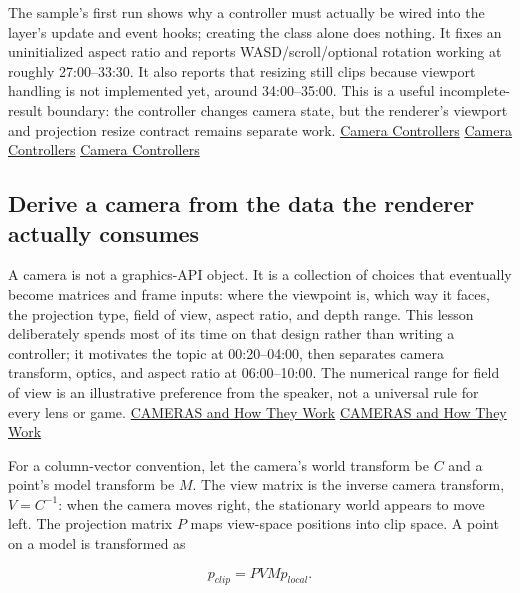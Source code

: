 The sample's first run shows why a controller must actually be wired into the layer's update and event hooks; creating the class alone does nothing. It fixes an uninitialized aspect ratio and reports WASD/scroll/optional rotation working at roughly 27:00--33:30. It also reports that resizing still clips because viewport handling is not implemented yet, around 34:00--35:00. This is a useful incomplete-result boundary: the controller changes camera state, but the renderer's viewport and projection resize contract remains separate work. \href{https://www.youtube.com/watch?v=q7rwMoZQSmw&t=1620s}{Camera Controllers} \href{https://www.youtube.com/watch?v=q7rwMoZQSmw&t=1740s}{Camera Controllers} \href{https://www.youtube.com/watch?v=q7rwMoZQSmw&t=2040s}{Camera Controllers}

\subsection{Derive a camera from the data the renderer actually consumes}\label{06-engine-ii-ch026-derive-a-camera-from-the-data-the-renderer-actually-consumes}

\hypertarget{06-engine-ii-ch026-derive-a-camera-from-the-data-the-renderer-actually-consumes}{}

A camera is not a graphics-API object. It is a collection of choices that eventually become matrices and frame inputs: where the viewpoint is, which way it faces, the projection type, field of view, aspect ratio, and depth range. This lesson deliberately spends most of its time on that design rather than writing a controller; it motivates the topic at 00:20--04:00, then separates camera transform, optics, and aspect ratio at 06:00--10:00. The numerical range for field of view is an illustrative preference from the speaker, not a universal rule for every lens or game. \href{https://www.youtube.com/watch?v=LfbqtmqxX04&t=20s}{CAMERAS and How They Work} \href{https://www.youtube.com/watch?v=LfbqtmqxX04&t=360s}{CAMERAS and How They Work}

For a column-vector convention, let the camera's world transform be \(C\) and a point's model transform be \(M\). The view matrix is the inverse camera transform, \(V=C^{-1}\): when the camera moves right, the stationary world appears to move left. The projection matrix \(P\) maps view-space positions into clip space. A point on a model is transformed as

\[p_{clip}=PVMp_{local}.\]

